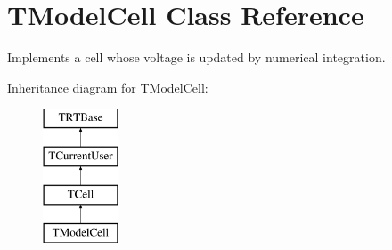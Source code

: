 \hypertarget{class_t_model_cell}{\section{T\+Model\+Cell Class Reference}
\label{class_t_model_cell}
}


Implements a cell whose voltage is updated by numerical integration.  


Inheritance diagram for T\+Model\+Cell\+:\begin{figure}[H]
\begin{center}
\leavevmode
\includegraphics[height=4.000000cm]{class_t_model_cell}
\end{center}
\end{figure}
